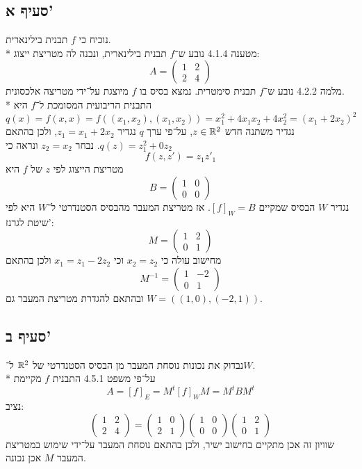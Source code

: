 \subsection{סעיף א'}
נוכיח כי $f$ תבנית בילינארית. \\*
מטענה 4.1.4 נובע ש־$f$ תבנית בילינארית, ונבנה לה מטריצת ייצוג:
\[
	A = \begin{pmatrix}
		1 & 2 \\
		2 & 4
	\end{pmatrix}
\]
מלמה 4.2.2 נובע ש־$f$ תבנית סימטרית.
נמצא בסיס בו $f$ מיוצגת על־ידי מטריצה אלכסונית. \\*
התבנית הריבועית המסומכת ל־$f$ היא
\[
	q(x) = f(x, x) = f((x_1, x_2), (x_1, x_2)) = x_1^2 + 4x_1 x_2 + 4 x_2^2 = {(x_1 + 2x_2)}^2
\]
נגדיר משתנה חדש $z \in \mathbb{R}^2$, על־פי ערך $q$ נגדיר $z_1 = x_1 + 2x_2$, ולכן בהתאם $q(z) = z_1^2 + 0z_2$.
נבחר $z_2 = x_2$ ונראה כי
\[
	f(z, z') = z_1 z'_1
\]
מטריצת הייצוג לפי $z$ של $f$ היא
\[
	B = \begin{pmatrix}
		1 & 0 \\
		0 & 0
	\end{pmatrix}
\]
נגדיר $W$ הבסיס שמקיים ${[f]}_W = B$. אז מטריצת המעבר מהבסיס הסטנדרטי ל־$W$ היא לפי שיטת לגרנז':
\[
	M = \begin{pmatrix}
		1 & 2 \\
		0 & 1
	\end{pmatrix}
\]
מחישוב עולה כי $x_2 = z_2$ וכי $x_1 = z_1 - 2z_2$ ולכן בהתאם
\[
	M^{-1} = \begin{pmatrix}
		1 & -2 \\
		0 & 1
	\end{pmatrix}
\]
ובהתאם להגדרת מטריצת המעבר גם $W = ((1, 0), (-2, 1))$.

\subsection{סעיף ב'}
נבדוק את נכונות נוסחת המעבר מן הבסיס הסטנדרטי של $\mathbb{R}^2$ ל־$W$. \\*
על־פי משפט 4.5.1 התבנית $f$ מקיימת
\[
	A = {[f]}_E = M^t {[f]}_W M = M^t B M^t
\]
נציב:
\[
	\begin{pmatrix}
		1 & 2 \\
		2 & 4
	\end{pmatrix}
	=
	\begin{pmatrix}
		1 & 0 \\
		2 & 1
	\end{pmatrix}
	\begin{pmatrix}
		1 & 0 \\
		0 & 0
	\end{pmatrix}
	\begin{pmatrix}
		1 & 2 \\
		0 & 1
	\end{pmatrix}
\]
שוויון זה אכן מתקיים בחישוב ישיר, ולכן בהתאם נוסחת המעבר על־ידי שימוש במטריצת המעבר $M$ אכן נכונה.

